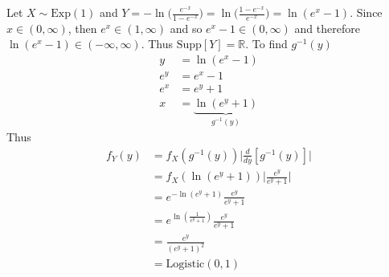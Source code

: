 \documentclass[12pt]{article}
\newcommand{\supp}[1]{\text{Supp}[ #1 ]}
\newcommand{\ginvy}{g^{-1}(y)}
\begin{document}
Let $X \sim \text{Exp}(1)$ and $Y = -\ln\Big( \frac{e^{-x}}{1 - e^{-x}}\Big) = \ln\Big( \frac{1 - e^{-x}}{e^{-x}}\Big) = \ln(e^x - 1)$. Since $x \in (0, \infty)$, then $e^x \in (1, \infty)$ and so $e^x - 1 \in (0, \infty)$ and therefore $\ln(e^x-1) \in (-\infty, \infty)$. Thus $\supp{Y} = \mathbb{R}$. 
To find $\ginvy$ $$ \begin{aligned} y &= \ln(e^x - 1) \\ e^y &= e^x - 1 \\ e^x &= e^y + 1 \\ x &= \underbrace{\ln(e^y + 1)}_{\ginvy} \end{aligned} $$ Thus $$ \begin{aligned} f_Y(y) &= f_X(\ginvy) \Big| \frac{d}{dy} [\ginvy] \Big| \\ &= f_X(\ln(e^y + 1))\Big| \frac{e^y}{e^y + 1} \Big| \\ &= e^{-\ln(e^y + 1)} \frac{e^y}{e^y + 1} \\ &= e^{\ln(\frac{1}{e^y + 1})} \frac{e^y}{e^y + 1} \\ &= \frac{e^y}{(e^y + 1)^2} \\ &= \text{Logistic}(0, 1) \end{aligned} $$ 
\end{document}
